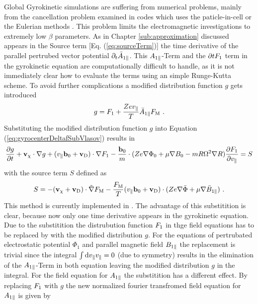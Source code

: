 Global Gyrokinetic simulations are suffering from numerical problems, mainly from the cancellation problem \cite{Chen2001} examined in codes which uses the paticle-in-cell or the Eulerian methods \cite{Cummings_PHD}. This problem limits the electromagnetic investigations to extremely low $\beta$ parameters. \cite{Naitou1995} As in Chapter \ref{sub:approximation} discussed appears in the Source term [Eq. (\ref{eq:sourceTerm})] the time derivative of the parallel pertrubed vector potential $\partial_t \bar{A}_{1\parallel}$. This $A_{1\parallel}$-Term and the $\partial t F_1$ term in the gyrokinetic equation are computationally difficult to handle, as it is not immediately clear how to evaluate the terms using an simple Runge-Kutta scheme. To avoid further complications a modified distribution function $g$ gets introduced
\begin{gather}
	g = F_1 + \frac{Ze v_\parallel}{T} \bar{A}_{1\parallel} F_\mathrm{M} ~.
	\label{eq:modifiedDistrubutionFunction}
\end{gather}
Substituting the modified distribution function $g$ into Equation (\ref{eq:gyrocenterDeltafSubVlasov}) results in
\begin{gather}
	\frac{\partial g}{\partial t} + \boldsymbol{\mathbf{v}}_\chi \cdot \nabla g + (v_\parallel \boldsymbol{\mathbf{b}}_0 + \boldsymbol{\mathbf{v}}_\mathrm{D}) \cdot \nabla F_1 - \frac{\boldsymbol{\mathbf{b}}_0}{m} \cdot (Z e \nabla \Phi_0 + \mu \nabla B_0 - m R \Omega^2 \nabla R) \frac{\partial F_1}{\partial v_\parallel} = S
	\label{eq:modifiedGyrocenterDeltafSubVlasov}
\end{gather}
with the source term $S$ defined as
\begin{gather}
	S = - (\boldsymbol{\mathbf{v}}_\chi + \boldsymbol{\mathbf{v}}_\mathrm{D}) \cdot \tilde{\nabla} F_\mathrm{M} - \frac{F_\mathrm{M}}{T} (v_\parallel \boldsymbol{\mathbf{b}}_0 + \boldsymbol{\mathbf{v}}_\mathrm{D}) \cdot (Ze \nabla \bar{\Phi} + \mu \nabla \bar{B}_{1\parallel}) ~.
	\label{eq:modifiedSourceTerm}
\end{gather}
This method is currently implemented in \gkw\cite{Peeters2009A}. The advantage of this substitition is clear, because now only one time derivative appears in the gyrokinetic equation. Due to the substitition the distrubution function $F_1$ in thge field equations has to be replaced by with the modified distribution $g$. For the equations of pertrubated electrostatic potential $\Phi_1$ and parallel magnetic field $B_{1\parallel}$ the replacement is trivial since the integral $\int \mathrm{d}v_\parallel v_\parallel = 0$ (due to symmetry) results in the elimination of the $A_{1\parallel}$-Term in both equation leaving the modified distribution $g$ in the integral. For the field equation for $A_{1\parallel}$ the substitition has a different effect. By replacing $F_1$ with $g$ the new normalized fourier transfromed field equation for $A_{1\parallel}$ is given by
